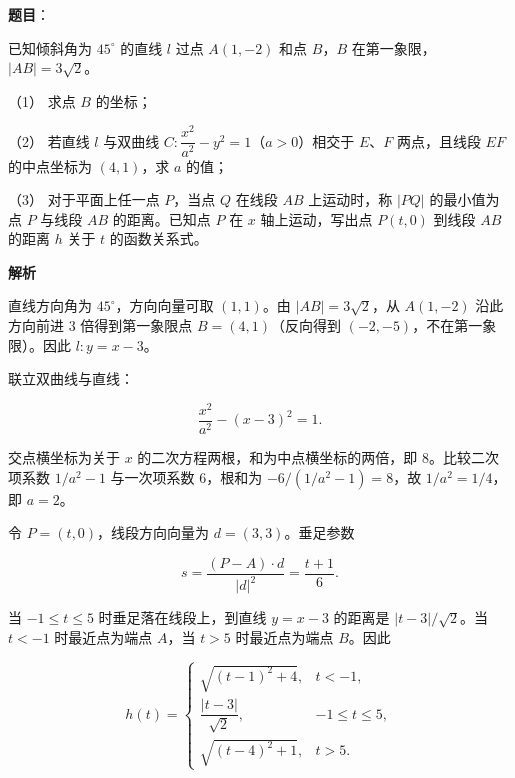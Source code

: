 \begin{answer}

\textbf{题目}：

已知倾斜角为 $45^\circ$ 的直线 $l$ 过点 $A(1,-2)$ 和点 $B$，$B$ 在第一象限，$|AB|=3\sqrt{2}$。

（1） 求点 $B$ 的坐标；

（2） 若直线 $l$ 与双曲线 $C:\dfrac{x^2}{a^2}-y^2=1$（$a>0$）相交于 $E$、$F$ 两点，且线段 $EF$ 的中点坐标为 $(4,1)$，求 $a$ 的值；

（3） 对于平面上任一点 $P$，当点 $Q$ 在线段 $AB$ 上运动时，称 $|PQ|$ 的最小值为点 $P$ 与线段 $AB$ 的距离。已知点 $P$ 在 $x$ 轴上运动，写出点 $P(t,0)$ 到线段 $AB$ 的距离 $h$ 关于 $t$ 的函数关系式。

\textbf{解析}


直线方向角为 $45^\circ$，方向向量可取 $(1,1)$。由 $|AB|=3\sqrt2$，从 $A(1,-2)$ 沿此方向前进 $3$ 倍得到第一象限点 $B=(4,1)$（反向得到 $(-2,-5)$，不在第一象限）。因此 $l:y=x-3$。


联立双曲线与直线：

\nopagebreak[4]
\[\frac{x^2}{a^2}-(x-3)^2=1.\]

交点横坐标为关于 $x$ 的二次方程两根，和为中点横坐标的两倍，即 $8$。比较二次项系数 $1/a^2-1$ 与一次项系数 $6$，根和为 $-6/(1/a^2-1)=8$，故 $1/a^2=1/4$，即 $a=2$。


令 $P=(t,0)$，线段方向向量为 $d=(3,3)$。垂足参数

\nopagebreak[4]
\[s=\frac{(P-A)\cdot d}{|d|^2}=\frac{t+1}{6}.\]

当 $-1\le t\le5$ 时垂足落在线段上，到直线 $y=x-3$ 的距离是 $|t-3|/\sqrt2$。当 $t<-1$ 时最近点为端点 $A$，当 $t>5$ 时最近点为端点 $B$。因此

\nopagebreak[4]
\[h(t)=\begin{cases}
\sqrt{(t-1)^2+4},&t<-1,\\[2pt]
\dfrac{|t-3|}{\sqrt2},&-1\le t\le5,\\[4pt]
\sqrt{(t-4)^2+1},&t>5.
\end{cases}\]




\end{answer}
